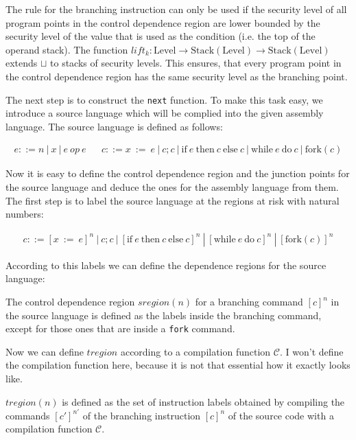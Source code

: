 \documentclass[a4paper,10pt]{llncs}
\begin{document}
The rule for the branching instruction can only be used if the security level of all program
points in the control dependence region are lower bounded by the security level of the value
that is used as the condition (i.e. the top of the operand stack). The function $lift_k :
\text{Level} \rightarrow \text{Stack}(\text{Level}) \rightarrow \text{Stack}(\text{Level})$
extends $\sqcup$ to stacks of security levels. This ensures, that every program point in the control
dependence region has the same security level as the branching point.

The next step is to construct the \texttt{next} function. To make this task easy, we introduce
a source language which will be complied into the given assembly language. The source language
is defined as follows:

\begin{align*}
e ::= n\ |\ x\ |\ e\ op\ e && c ::= x\ :=\ e\ |\ c;c\ |\ \text{if}\ e\ \text{then}\ c\ \text{else}\ c\ |\ \text{while}\ e\ \text{do}\ c\ |\ \text{fork}(c)
\end{align*}

Now it is easy to define the control dependence region and the junction points for the source
language and deduce the ones for the assembly language from them. The first step is to label the
source language at the regions at risk with natural numbers:

\begin{align*}
c ::= [x\ :=\ e]^n\ |\ c;c\ |\ [\text{if}\ e\ \text{then}\ c\ \text{else}\ c]^n\ |\ [\text{while}\ e\ \text{do}\ c]^n\ |\ [\text{fork}(c)]^n
\end{align*}

According to this labels we can define the dependence regions for the source language:

\begin{definition}
The control dependence region $sregion(n)$ for a branching command $[c]^n$ in the source language is
defined as the labels inside the branching command, except for those ones that are inside a
\texttt{fork} command.
\end{definition}

Now we can define $tregion$ according to a compilation function $\mathcal{C}$. I won't define
the compilation function here, because it is not that essential how it exactly looks like.

\begin{definition}
$tregion(n)$ is defined as the set of instruction labels obtained by compiling the commands
$[c']^{n'}$ of the branching instruction $[c]^n$ of the source code with a compilation function $\mathcal{C}$.
\end{definition}
\end{document}
